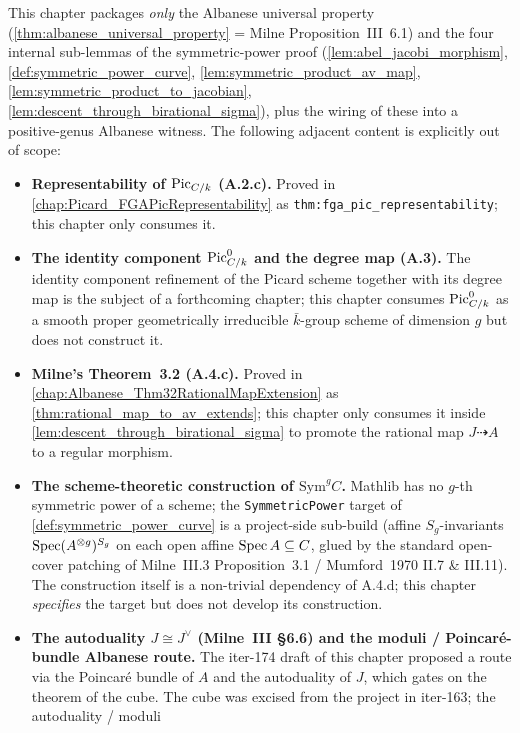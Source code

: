 This chapter packages \emph{only} the Albanese universal property
(\cref{thm:albanese_universal_property} = Milne Proposition~III~6.1) and the
four internal sub-lemmas of the symmetric-power proof
(\cref{lem:abel_jacobi_morphism},
\cref{def:symmetric_power_curve},
\cref{lem:symmetric_product_av_map},
\cref{lem:symmetric_product_to_jacobian},
\cref{lem:descent_through_birational_sigma}), plus the wiring of these into
a positive-genus Albanese witness. The following adjacent content is
explicitly out of scope:
\begin{itemize}
  \item \textbf{Representability of \(\operatorname{Pic}_{C/k}\) (A.2.c).} Proved in
    \cref{chap:Picard_FGAPicRepresentability} as
    \texttt{thm:fga_pic_representability}; this chapter only consumes it.
  \item \textbf{The identity component \(\operatorname{Pic}^0_{C/k}\) and the degree map
    (A.3).} The identity component refinement of the Picard scheme together
    with its degree map is the subject of a forthcoming chapter; this chapter
    consumes \(\operatorname{Pic}^0_{C/k}\) as a smooth proper geometrically irreducible
    \(\bar k\)-group scheme of dimension \(g\) but does not construct it.
  \item \textbf{Milne's Theorem~3.2 (A.4.c).} Proved in
    \cref{chap:Albanese_Thm32RationalMapExtension} as
    \cref{thm:rational_map_to_av_extends}; this chapter only consumes it
    inside \cref{lem:descent_through_birational_sigma} to promote the
    rational map \(J \dashrightarrow A\) to a regular morphism.
  \item \textbf{The scheme-theoretic construction of \(\mathrm{Sym}^g C\).}
    Mathlib has no \(g\)-th symmetric power of a scheme; the
    \texttt{SymmetricPower} target of \cref{def:symmetric_power_curve} is a
    project-side sub-build (affine \(S_g\)-invariants
    \(\operatorname{Spec}(A^{\otimes g})^{S_g}\) on each open affine \(\operatorname{Spec} A \subseteq C\),
    glued by the standard open-cover patching of Milne~III.3
    Proposition~3.1 / Mumford~1970 II.7 \& III.11). The construction itself
    is a non-trivial dependency of A.4.d; this chapter \emph{specifies} the
    target but does not develop its construction.
  \item \textbf{The autoduality \(J \cong J^\vee\) (Milne~III \S 6.6) and the
    moduli / Poincar\'e-bundle Albanese route.} The iter-174 draft of this
    chapter proposed a route via the Poincar\'e bundle of \(A\) and the
    autoduality of \(J\), which gates on the theorem of the cube. The cube
    was excised from the project in iter-163; the autoduality / moduli

\end{itemize}

